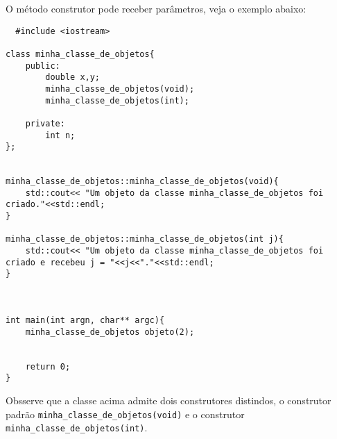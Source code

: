 O método construtor pode receber parâmetros, veja o exemplo abaixo:

\begin{verbatim}
  #include <iostream>

class minha_classe_de_objetos{
	public:
		double x,y;
		minha_classe_de_objetos(void);
		minha_classe_de_objetos(int);

	private:
		int n;		
};


minha_classe_de_objetos::minha_classe_de_objetos(void){
	std::cout<< "Um objeto da classe minha_classe_de_objetos foi criado."<<std::endl;
}

minha_classe_de_objetos::minha_classe_de_objetos(int j){
	std::cout<< "Um objeto da classe minha_classe_de_objetos foi criado e recebeu j = "<<j<<"."<<std::endl;
}



int main(int argn, char** argc){
	minha_classe_de_objetos objeto(2);


	return 0;
}
\end{verbatim}
 Obsserve que a classe acima admite dois construtores distindos, o construtor padrão \verb+minha_classe_de_objetos(void)+ e o construtor \verb+minha_classe_de_objetos(int)+.